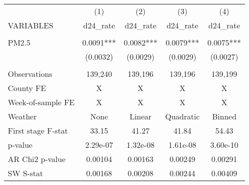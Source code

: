 \begin{tabular}{lcccc} \hline
 & (1) & (2) & (3) & (4) \\
VARIABLES & d24\_rate & d24\_rate & d24\_rate & d24\_rate \\ \hline
 &  &  &  &  \\
PM2.5 & 0.0091*** & 0.0082*** & 0.0079*** & 0.0075*** \\
 & (0.0032) & (0.0029) & (0.0029) & (0.0027) \\
 &  &  &  &  \\
Observations & 139,240 & 139,196 & 139,196 & 139,199 \\
County FE & X & X & X & X \\
Week-of-sample FE & X & X & X & X \\
Weather & None & Linear & Quadratic & Binned \\
First stage F-stat & 33.15 & 41.27 & 41.84 & 54.43 \\
p-value & 2.29e-07 & 1.32e-08 & 1.61e-08 & 3.60e-10 \\
AR Chi2 p-value & 0.00104 & 0.00163 & 0.00249 & 0.00291 \\
 SW S-stat & 0.00168 & 0.00208 & 0.00244 & 0.00409 \\ \hline
\end{tabular}
